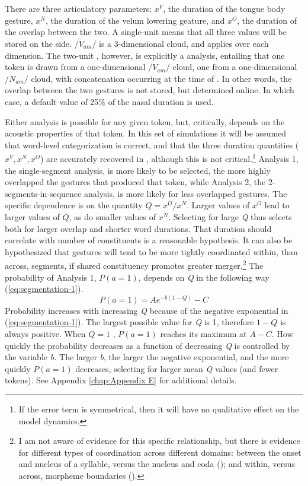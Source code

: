 There are three articulatory parameters: $x^{V}$, the duration of the tongue body gesture, $x^{N}$, the duration of the velum lowering geature, and $x^{O}$, the duration of the overlap between the two. A single-unit 
means that all three values will be stored on the  side.
$/\tilde{V}_{am}/$ is a 3-dimensional cloud, and  applies
over each dimension. The two-unit , however, is explicitly a 
analysis, entailing that one token is drawn from a one-dimensional
\emph{$/V_{am}/$} cloud, one from a one-dimensional \emph{$/N_{am}/$}
cloud, with concatenation occurring at the time of . In
other words, the overlap between the two gestures is not stored, but
determined online. In which case, a default value of 25\% of the nasal duration is used.

Either analysis is possible for any given token, but, critically,
depends on the acoustic properties of that token. In this set of simulations
it will be assumed that word-level categorization is correct, and
that the three duration quantities ($x^{V},x^{N},x^{O}$)
are accurately recovered in , although this is not critical.\footnote{If the error term is symmetrical, then it will have no qualitative
effect on the model dynamics.} Analysis 1, the single-segment analysis, is more likely to be selected,
the more highly overlapped the gestures that produced that token,
while Analysis 2, the 2-segments-in-sequence analysis, is more likely
for less overlapped gestures. The specific dependence is on the quantity
$Q={x^{O}}/{x^{N}}$. Larger values of $x^{O}$
lead to larger values of $Q$, as do smaller values of $x^{N}$.
Selecting for large \emph{Q} thus selects both for larger overlap
and shorter word durations. That duration should correlate with number
of constituents is a reasonable hypothesis. It can also be hypothesized
that  gestures will tend to be more tightly coordinated
within, than across, segments, if shared constituency promotes greater
merger.\footnote{I am not aware of evidence for this specific relationship, but there
is evidence for different types of  coordination across different
domains: between the onset and nucleus of a syllable, versus the nucleus
and coda (\citealt{Browman1988,byrd1996influences}); and within,
versus across, morpheme boundaries (\citealt{Cho2001}).} The probability of Analysis 1, $P(a=1)$, depends on \emph{Q} in
the following way (\ref{eq:segmentation-1}).
\begin{equation}
P(a=1)=Ae^{-b(1-Q)}-C\label{eq:segmentation-1}
\end{equation}
Probability increases with increasing \emph{Q} because of the negative
exponential in (\ref{eq:segmentation-1}). The largest possible value
for \emph{Q} is 1, therefore $1-Q$ is always positive. When $Q=1$
, $P(a=1)$ reaches its maximum at $A-C$. How quickly the probability
decreases as a function of decreasing \emph{Q} is controlled by the
variable \emph{b. }The larger \emph{b}, the larger the negative exponential,
and the more quickly $P(a=1)$ decreases, selecting for larger mean
\emph{Q} values (and fewer tokens). See Appendix \ref{chap:Appendix E}
for additional details.

